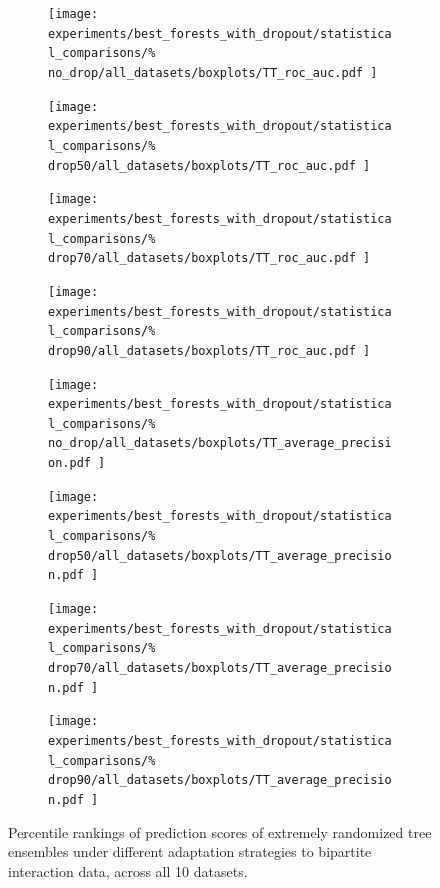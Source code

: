 \begin{figure}[tbh]
    \begin{subfigure}{0.24\textwidth}
        \texttt{[image: 
            experiments/best\_forests\_with\_dropout/statistical\_comparisons/\%
            no\_drop/all\_datasets/boxplots/TT\_roc\_auc.pdf
        ]}
    \end{subfigure}
    \begin{subfigure}{0.24\textwidth}
        \texttt{[image: 
            experiments/best\_forests\_with\_dropout/statistical\_comparisons/\%
            drop50/all\_datasets/boxplots/TT\_roc\_auc.pdf
        ]}
    \end{subfigure}
    \begin{subfigure}{0.24\textwidth}
        \texttt{[image: 
            experiments/best\_forests\_with\_dropout/statistical\_comparisons/\%
            drop70/all\_datasets/boxplots/TT\_roc\_auc.pdf
        ]}
    \end{subfigure}
    \begin{subfigure}{0.24\textwidth}
        \texttt{[image: 
            experiments/best\_forests\_with\_dropout/statistical\_comparisons/\%
            drop90/all\_datasets/boxplots/TT\_roc\_auc.pdf
        ]}
    \end{subfigure}

    \begin{subfigure}{0.24\textwidth}
        \texttt{[image: 
            experiments/best\_forests\_with\_dropout/statistical\_comparisons/\%
            no\_drop/all\_datasets/boxplots/TT\_average\_precision.pdf
        ]}
    \end{subfigure}
    \begin{subfigure}{0.24\textwidth}
        \texttt{[image: 
            experiments/best\_forests\_with\_dropout/statistical\_comparisons/\%
            drop50/all\_datasets/boxplots/TT\_average\_precision.pdf
        ]}
    \end{subfigure}
    \begin{subfigure}{0.24\textwidth}
        \texttt{[image: 
            experiments/best\_forests\_with\_dropout/statistical\_comparisons/\%
            drop70/all\_datasets/boxplots/TT\_average\_precision.pdf
        ]}
    \end{subfigure}
    \begin{subfigure}{0.24\textwidth}
        \texttt{[image: 
            experiments/best\_forests\_with\_dropout/statistical\_comparisons/\%
            drop90/all\_datasets/boxplots/TT\_average\_precision.pdf
        ]}
    \end{subfigure}
    \caption{
        Percentile rankings of prediction scores of extremely randomized tree ensembles under different adaptation strategies to bipartite interaction data, across all 10 datasets.
    }
    \label{fig:best_forests}
\end{figure}


